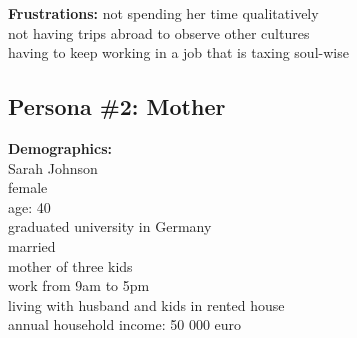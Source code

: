 \documentclass[a4paper,10pt,oneside]{scrreprt}
\begin{document}
\begin{mdframed}
\begin{minipage}{\textwidth}


				\textbf{Frustrations:}
				not spending her time qualitatively\\
				not having trips abroad to observe other cultures\\
				having to keep working in a job that is taxing soul-wise


%
%
%
%
%
%
%

			\end{minipage}
		\end{mdframed}

		\subsection{Persona \#2: Mother}

		\textbf{Demographics:}\\
				Sarah Johnson\\
				female\\
				age: 40\\
				graduated university in Germany\\
				married\\
				mother of three kids\\
				work from 9am to 5pm\\
				living with husband and kids in rented house\\
				annual household income: 50 000 euro\\
\end{document}
